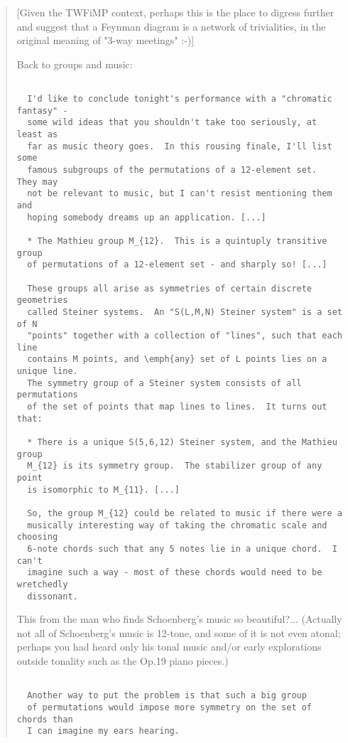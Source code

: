 \begin{quote}
[Given the TWFiMP context, perhaps this is the place to digress further
and suggest that a Feynman diagram is a network of trivialities, in the
original meaning of "3-way meetings" :-)]

Back to groups and music:


\begin{verbatim}

  I'd like to conclude tonight's performance with a "chromatic fantasy" -
  some wild ideas that you shouldn't take too seriously, at least as
  far as music theory goes.  In this rousing finale, I'll list some
  famous subgroups of the permutations of a 12-element set.  They may
  not be relevant to music, but I can't resist mentioning them and
  hoping somebody dreams up an application. [...]

  * The Mathieu group M_{12}.  This is a quintuply transitive group
  of permutations of a 12-element set - and sharply so! [...]
 
  These groups all arise as symmetries of certain discrete geometries
  called Steiner systems.  An "S(L,M,N) Steiner system" is a set of N
  "points" together with a collection of "lines", such that each line
  contains M points, and \emph{any} set of L points lies on a unique line.
  The symmetry group of a Steiner system consists of all permutations
  of the set of points that map lines to lines.  It turns out that:
 
  * There is a unique S(5,6,12) Steiner system, and the Mathieu group
  M_{12} is its symmetry group.  The stabilizer group of any point 
  is isomorphic to M_{11}. [...]
 
  So, the group M_{12} could be related to music if there were a
  musically interesting way of taking the chromatic scale and choosing
  6-note chords such that any 5 notes lie in a unique chord.  I can't
  imagine such a way - most of these chords would need to be wretchedly
  dissonant.
\end{verbatim}
    

This from the man who finds Schoenberg's music so beautiful?...
(Actually not all of Schoenberg's music is 12-tone, and some of it
is not even atonal; perhaps you had heard only his tonal music and/or
early explorations outside tonality such as the Op.19 piano pieces.)


\begin{verbatim}

  Another way to put the problem is that such a big group
  of permutations would impose more symmetry on the set of chords than
  I can imagine my ears hearing.
\end{verbatim}
    


\end{quote}
